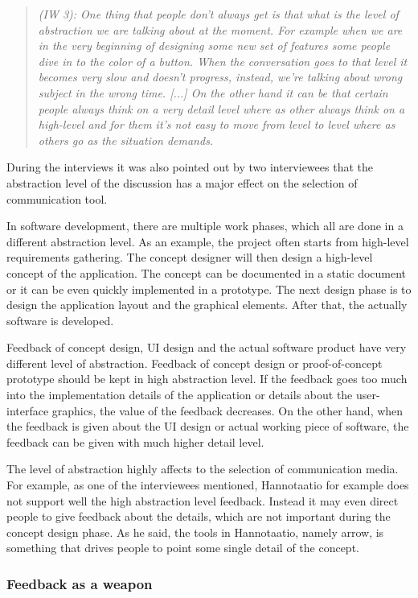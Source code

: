 \documentclass[english,12pt,a4paper,pdftex]{article}
\newcommand{\q}[2]{
\begin{quote}
\emph{(IW #1): #2}
\end{quote}}
\begin{document}
\q{3}{One thing that people don't always get is that what is the level of abstraction we are talking about at the moment. For example when we are in the very beginning of designing some new set of features some people dive in to the color of a button. When the conversation goes to that level it becomes very slow and doesn't progress, instead, we're talking about wrong subject in the wrong time. [...] On the other hand it can be that certain people always think on a very detail level where as other always think on a high-level and for them it's not easy to move from level to level where as others go as the situation demands.}

During the interviews it was also pointed out by two interviewees that the abstraction level of the discussion has a major effect on the selection of communication tool.

In software development, there are multiple work phases, which all are done in a different abstraction level. As an example, the project often starts from high-level requirements gathering. The concept designer will then design a high-level concept of the application. The concept can be documented in a static document or it can be even quickly implemented in a prototype. The next design phase is to design the application layout and the graphical elements. After that, the actually software is developed.

Feedback of concept design, \ac{UI} design and the actual software product have very different level of abstraction. Feedback of concept design or proof-of-concept prototype should be kept in high abstraction level. If the feedback goes too much into the implementation details of the application or details about the user-interface graphics, the value of the feedback decreases. On the other hand, when the feedback is given about the \ac{UI} design or actual working piece of software, the feedback can be given with much higher detail level.

The level of abstraction highly affects to the selection of communication media. For example, as one of the interviewees mentioned, Hannotaatio for example does not support well the high abstraction level feedback. Instead it may even direct people to give feedback about the details, which are not important during the concept design phase. As he said, the tools in Hannotaatio, namely arrow, is something that drives people to point some single detail of the concept.

\subsubsection{Feedback as a weapon}
\end{document}
